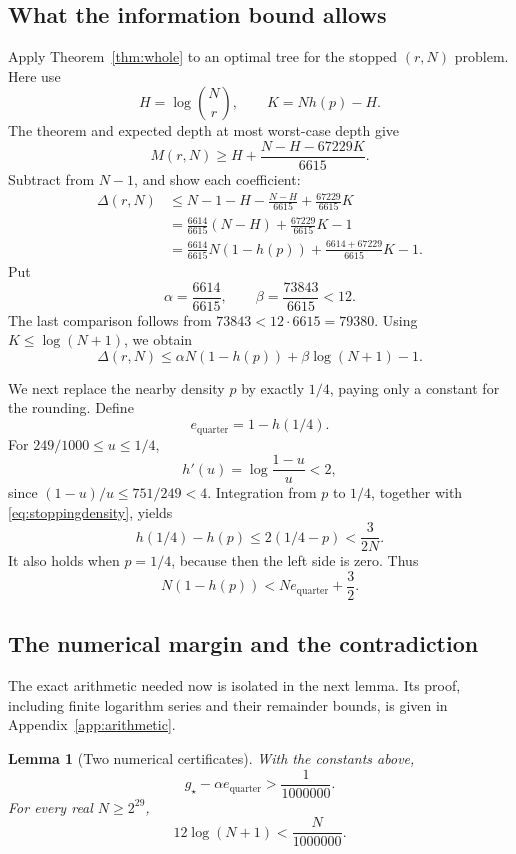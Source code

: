 \documentclass[11pt]{article}
\newtheorem{lemma}[theorem]{Lemma}
\theoremstyle{definition}
\theoremstyle{remark}
\newcommand{\er}{e_{\mathrm{quarter}}}
\numberwithin{equation}{section}
\begin{document}
\subsection{What the information bound allows}

Apply Theorem~\ref{thm:whole} to an optimal tree for the stopped
\((r,N)\) problem. Here use
\[
 H=\log\binom Nr,\qquad K=Nh(p)-H.
\]
The theorem and expected depth at most worst-case depth give
\[
 M(r,N)\ge H+\frac{N-H-67229K}{6615}.
\]
Subtract from \(N-1\), and show each coefficient:
\begin{align*}
 \Delta(r,N)
 &\le N-1-H-\frac{N-H}{6615}+\frac{67229}{6615}K\\
 &=\frac{6614}{6615}(N-H)+\frac{67229}{6615}K-1\\
 &=\frac{6614}{6615}N(1-h(p))
    +\frac{6614+67229}{6615}K-1.
\end{align*}
Put
\[
 \alpha=\frac{6614}{6615},\qquad
 \beta=\frac{73843}{6615}<12.
\]
The last comparison follows from \(73843<12\cdot6615=79380\).
Using \(K\le\log(N+1)\), we obtain
\begin{equation}\label{eq:upper-saving}
 \Delta(r,N)\le
 \alpha N(1-h(p))+\beta\log(N+1)-1.
\end{equation}

We next replace the nearby density \(p\) by exactly \(1/4\), paying
only a constant for the rounding. Define
\[
 \er=1-h(1/4).
\]
For \(249/1000\le u\le1/4\),
\[
 h'(u)=\log\frac{1-u}{u}<2,
\]
since \((1-u)/u\le751/249<4\).
Integration from \(p\) to \(1/4\), together with
\eqref{eq:stoppingdensity}, yields
\[
 h(1/4)-h(p)\le2(1/4-p)<\frac3{2N}.
\]
It also holds when \(p=1/4\), because then the left side is zero.
Thus
\begin{equation}\label{eq:roundedentropy}
 N(1-h(p))<N\er+\frac32.
\end{equation}

\subsection{The numerical margin and the contradiction}

The exact arithmetic needed now is isolated in the next lemma.
Its proof, including finite logarithm series and their remainder
bounds, is given in Appendix~\ref{app:arithmetic}.

\begin{lemma}[Two numerical certificates]\label{lem:numerics}
With the constants above,
\begin{equation}\label{eq:positive-margin}
 g_\star-\alpha\er>\frac1{1000000}.
\end{equation}
For every real \(N\ge2^{29}\),
\begin{equation}\label{eq:logcutoff}
 12\log(N+1)<\frac N{1000000}.
\end{equation}
\end{lemma}
\end{document}
